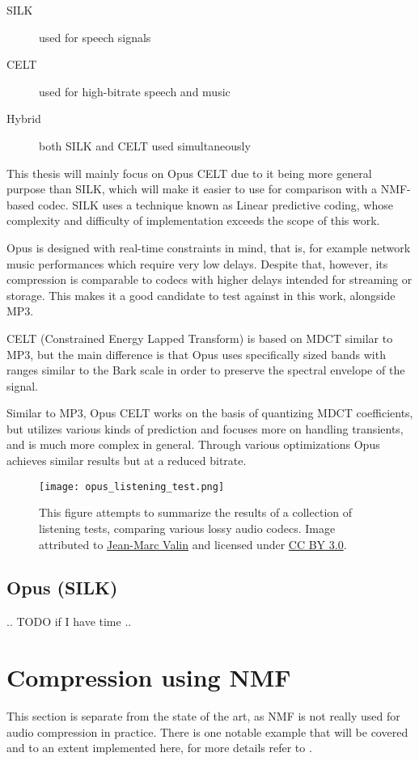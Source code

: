 \begin{description}
	\item[SILK] used for speech signals
	\item[CELT] used for high-bitrate speech and music
	\item[Hybrid] both SILK and CELT used simultaneously
\end{description}

This thesis will mainly focus on Opus CELT due to it being more general purpose than SILK, which will make it easier to use for comparison with a NMF-based codec. SILK uses a technique known as Linear predictive coding, whose complexity and difficulty of implementation exceeds the scope of this work.

Opus is designed with real-time constraints in mind, that is, for example network music performances which require very low delays. Despite that, however, its compression is comparable to codecs with higher delays intended for streaming or storage. This makes it a good candidate to test against in this work, alongside MP3.

CELT (Constrained Energy Lapped Transform) is based on MDCT similar to MP3, but the main difference is that Opus uses specifically sized bands with ranges similar to the Bark scale in order to preserve the spectral envelope of the signal.

Similar to MP3, Opus CELT works on the basis of quantizing MDCT coefficients, but utilizes various kinds of prediction and focuses more on handling transients, and is much more complex in general. Through various optimizations Opus achieves similar results but at a reduced bitrate.

\begin{figure}[ht]
	\caption[Comparison of various audio codecs]{This figure attempts to summarize the results of a collection of listening tests, comparing various lossy audio codecs. Image attributed to \href{http://opus-codec.org/comparison/}{Jean-Marc Valin} and licensed under \href{https://creativecommons.org/licenses/by/3.0/}{CC BY 3.0}.}
	\centering
	\texttt{[image: opus\_listening\_test.png]}
\end{figure}

\subsection{Opus (SILK)}
.. TODO if I have time ..

\section{Compression using NMF}
This section is separate from the state of the art, as NMF is not really used for audio compression in practice. There is one notable example that will be covered and to an extent implemented here, for more details refer to \cite{nikunen_2010}.


